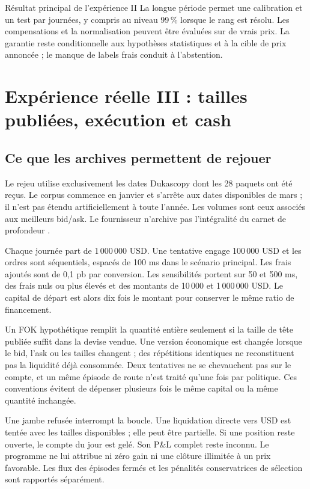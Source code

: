 \begin{callout}{Résultat principal de l'expérience II}
La longue période permet une calibration et un test par journées, y compris au niveau 99\,\% lorsque le rang est résolu. Les compensations et la normalisation peuvent être évaluées sur de vrais prix. La garantie reste conditionnelle aux hypothèses statistiques et à la cible de prix annoncée ; le manque de labels frais conduit à l'abstention.
\end{callout}

\clearpage
\section{Expérience réelle III : tailles publiées, exécution et cash}
\label{sec:emp-execution}

\subsection{Ce que les archives permettent de rejouer}

Le rejeu utilise exclusivement les dates Dukascopy dont les 28 paquets ont été reçus. Le corpus commence en janvier et s'arrête aux dates disponibles de mars ; il n'est pas étendu artificiellement à toute l'année. Les volumes sont ceux associés aux meilleurs bid/ask. Le fournisseur n'archive pas l'intégralité du carnet de profondeur \cite{emp-duka-faq}.

Chaque journée part de 1\,000\,000 USD. Une tentative engage 100\,000 USD et les ordres sont séquentiels, espacés de 100 ms dans le scénario principal. Les frais ajoutés sont de 0,1 pb par conversion. Les sensibilités portent sur 50 et 500 ms, des frais nuls ou plus élevés et des montants de 10\,000 et 1\,000\,000 USD. Le capital de départ est alors dix fois le montant pour conserver le même ratio de financement.

Un FOK hypothétique remplit la quantité entière seulement si la taille de tête publiée suffit dans la devise vendue. Une version économique est changée lorsque le bid, l'ask ou les tailles changent ; des répétitions identiques ne reconstituent pas la liquidité déjà consommée. Deux tentatives ne se chevauchent pas sur le compte, et un même épisode de route n'est traité qu'une fois par politique. Ces conventions évitent de dépenser plusieurs fois le même capital ou la même quantité inchangée.

Une jambe refusée interrompt la boucle. Une liquidation directe vers USD est tentée avec les tailles disponibles ; elle peut être partielle. Si une position reste ouverte, le compte du jour est gelé. Son P\&L complet reste inconnu. Le programme ne lui attribue ni zéro gain ni une clôture illimitée à un prix favorable. Les flux des épisodes fermés et les pénalités conservatrices de sélection sont rapportés séparément.

